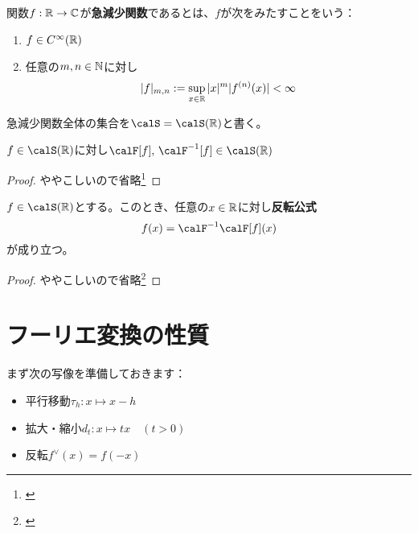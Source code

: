 \documentclass[report]{jlreq}
\begin{document}
\begin{definition}
    関数$f: \mathbb{R} \to \mathbb{C}$が\textbf{急減少関数}であるとは、$f$が次をみたすことをいう\footnotemark ：
    \begin{enumerate}
        \item $f \in C^{\infty}(\mathbb{R})$
        \item 任意の$m, n \in \mathbb{N}$に対し
        \begin{equation}
            |f|_{m,n} := \sup_{x \in \mathbb{R}} |x|^m |f^{(n)} (x)| < \infty
        \end{equation}
    \end{enumerate}
    急減少関数全体の集合を$\calS = \calS(\R)$と書く。
\end{definition}


    \begin{theorem}
        $f \in \calS(\R)$に対し$\calF [f],\, \calF^{-1} [f] \in \calS(\R)$
    \end{theorem}

\begin{proof}
    ややこしいので省略\footnote{\cite[第VII章 定理6.7]{杉浦85}}
\end{proof}

    \begin{theorem}[反転公式]
        $f \in \calS(\R)$とする。このとき、任意の$x \in \mathbb{R}$に対し\textbf{反転公式}
        \begin{equation}
            f(x) = \calF^{-1} \calF [f](x)
        \end{equation}
        が成り立つ。
    \end{theorem}

\begin{proof}
    ややこしいので省略\footnote{\cite[第VII章 定理6.7]{杉浦85}}
\end{proof}



%
\section{フーリエ変換の性質}

まず次の写像を準備しておきます：
\begin{itemize}
    \item 平行移動$\tau_h: x \mapsto x - h$
    \item 拡大・縮小$d_t: x \mapsto tx \quad (t > 0)$
    \item 反転$f^{\vee}(x) = f(-x)$
\end{itemize}
\end{document}
